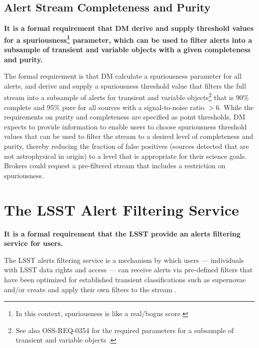 \documentclass[DM,lsstdraft,authoryear,toc]{lsstdoc}
\begin{document}
\subsection{Alert Stream Completeness and Purity}\label{ssec:comp_pure}

{\bf It is a formal requirement that DM derive and supply threshold values for a spuriousness\footnote{In this context, spuriousness is like a real/bogus score.} parameter, which can be used to filter alerts into a subsample of transient and variable objects with a given completeness and purity.}

The formal requirement is that DM calculate a spuriousness parameter for all alerts, and derive and supply a spuriousness threshold value that filters the full stream into a subsample of alerts for transient and variable objects\footnote{See also OSS-REQ-0354 for the required parameters for a subsample of transient and variable objects .} that is 90\% complete and 95\% pure for all sources with a signal-to-noise ratio $>$6. While the requirements on purity and completeness are specified as point thresholds, DM expects to provide information to enable users to choose spuriousness threshold values that can be used to filter the stream to a desired level of completeness and purity, thereby reducing the fraction of false positives (sources detected that are not astrophysical in origin) to a level that is appropriate for their science goals. Brokers could request a pre-filtered stream that includes a restriction on spuriousness.


\section{The LSST Alert Filtering Service} \label{sec:LAFS}

{\bf It is a formal requirement that the LSST provide an alerts filtering service for users.} 

The LSST alerts filtering service is a mechanism by which users --- individuals with LSST data rights and access --- can receive alerts via pre-defined filters that have been optimized for established transient classifications such as supernovae and/or create and apply their own filters to the stream . 


\end{document}
